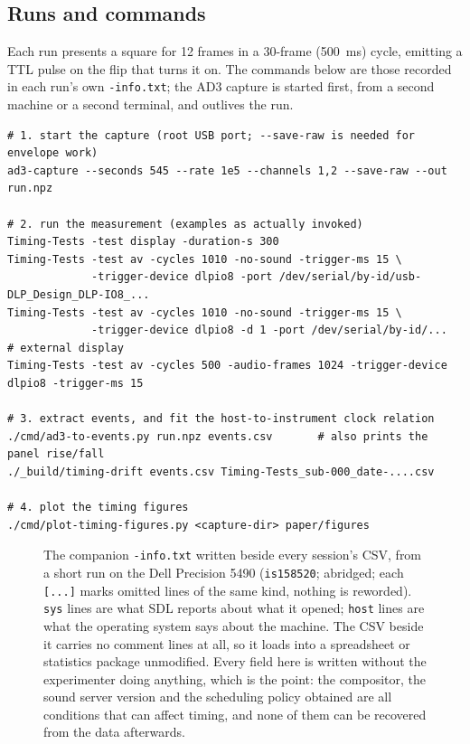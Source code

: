\documentclass[doc,a4paper,floatsintext]{apa7}
\begin{document}
\subsection{Runs and commands}

Each run presents a square for 12 frames in a 30-frame (500~ms) cycle, emitting
a TTL pulse on the flip that turns it on. The commands below are those recorded
in each run's own \texttt{-info.txt}; the AD3 capture is started first, from a
second machine or a second terminal, and outlives the run.

\begin{lstlisting}[basicstyle=\ttfamily\scriptsize,numbers=none,breaklines=true]
# 1. start the capture (root USB port; --save-raw is needed for envelope work)
ad3-capture --seconds 545 --rate 1e5 --channels 1,2 --save-raw --out run.npz

# 2. run the measurement (examples as actually invoked)
Timing-Tests -test display -duration-s 300
Timing-Tests -test av -cycles 1010 -no-sound -trigger-ms 15 \
             -trigger-device dlpio8 -port /dev/serial/by-id/usb-DLP_Design_DLP-IO8_...
Timing-Tests -test av -cycles 1010 -no-sound -trigger-ms 15 \
             -trigger-device dlpio8 -d 1 -port /dev/serial/by-id/...   # external display
Timing-Tests -test av -cycles 500 -audio-frames 1024 -trigger-device dlpio8 -trigger-ms 15

# 3. extract events, and fit the host-to-instrument clock relation
./cmd/ad3-to-events.py run.npz events.csv       # also prints the panel rise/fall
./_build/timing-drift events.csv Timing-Tests_sub-000_date-....csv

# 4. plot the timing figures
./cmd/plot-timing-figures.py <capture-dir> paper/figures
\end{lstlisting}

\begin{figure}[htb]

\caption{The companion \texttt{-info.txt} written beside every session's CSV,
  from a short run on the Dell Precision 5490 (\texttt{is158520}; abridged; each
  \texttt{[...]} marks omitted lines of the same kind, nothing is reworded).
  \texttt{sys} lines are what SDL reports about what it opened; \texttt{host}
  lines are what the operating system says about the machine. The CSV beside it
  carries no comment lines at all, so it loads into a spreadsheet or statistics
  package unmodified. Every field here is written without the experimenter doing
  anything, which is the point: the compositor, the sound server version and the
  scheduling policy obtained are all conditions that can affect timing, and none
  of them can be recovered from the data afterwards.}
\label{fig:infofile}
\end{figure}
\end{document}
